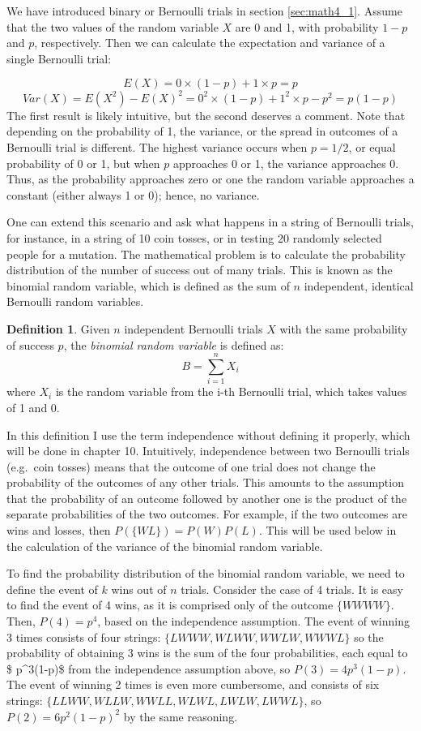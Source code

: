 \documentclass[
]{book}
\theoremstyle{definition}
\newtheorem{definition}{Definition}[chapter]
\theoremstyle{definition}
\theoremstyle{definition}
\theoremstyle{remark}
\begin{document}
We have introduced binary or Bernoulli trials in section \ref{sec:math4_1}. Assume that the two values of the random variable \(X\) are 0 and 1, with probability \(1-p\) and \(p\), respectively. Then we can calculate the expectation and variance of a single Bernoulli trial:

\[E(X) = 0 \times (1-p) + 1 \times p = p\]
\[ Var(X) = E(X^2) - E(X)^2 = 0^2 \times (1-p) + 1^2 \times p - p^2= p(1-p)\]
The first result is likely intuitive, but the second deserves a comment. Note that depending on the probability of 1, the variance, or the spread in outcomes of a Bernoulli trial is different. The highest variance occurs when \(p=1/2\), or equal probability of 0 or 1, but when \(p\) approaches 0 or 1, the variance approaches 0. Thus, as the probability approaches zero or one the random variable approaches a constant (either always 1 or 0); hence, no variance.

One can extend this scenario and ask what happens in a string of Bernoulli trials, for instance, in a string of 10 coin tosses, or in testing 20 randomly selected people for a mutation. The mathematical problem is to calculate the probability distribution of the number of success out of many trials. This is known as the binomial random variable, which is defined as the sum of \(n\) independent, identical Bernoulli random variables.

\begin{definition}
\protect\hypertarget{def:def-binom}{}{\label{def:def-binom} }Given \(n\) independent Bernoulli trials \(X\) with the same probability of success \(p\), the \emph{binomial random variable} is defined as:
\[B = \sum_{i=1}^n X_i\]
where \(X_i\) is the random variable from the i-th Bernoulli trial, which takes values of 1 and 0.
\end{definition}

In this definition I use the term independence without defining it properly, which will be done in chapter 10. Intuitively, independence between two Bernoulli trials (e.g.~coin tosses) means that the outcome of one trial does not change the probability of the outcomes of any other trials. This amounts to the assumption that the probability of an outcome followed by another one is the product of the separate probabilities of the two outcomes. For example, if the two outcomes are wins and losses, then \(P(\{WL\}) = P(W)P(L)\). This will be used below in the calculation of the variance of the binomial random variable.

To find the probability distribution of the binomial random variable, we need to define the event of \(k\) wins out of \(n\) trials. Consider the case of 4 trials. It is easy to find the event of 4 wins, as it is comprised only of the outcome \(\{WWWW\}\). Then, \(P(4) = p^4\), based on the independence assumption. The event of winning 3 times consists of four strings: \(\{LWWW, WLWW, WWLW, WWWL\}\) so the probability of obtaining 3 wins is the sum of the four probabilities, each equal to \$ p\^{}3(1-p)\$ from the independence assumption above, so \(P(3) = 4p^3(1-p)\). The event of winning 2 times is even more cumbersome, and consists of six strings: \(\{ LLWW, WLLW, WWLL, WLWL, LWLW, LWWL\}\), so \(P(2) = 6p^2(1-p)^2\) by the same reasoning.
\end{document}
